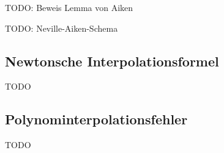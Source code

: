 TODO: Beweis Lemma von Aiken

TODO: Neville-Aiken-Schema

\subsection{Newtonsche Interpolationsformel}

TODO

\subsection{Polynominterpolationsfehler}

TODO

